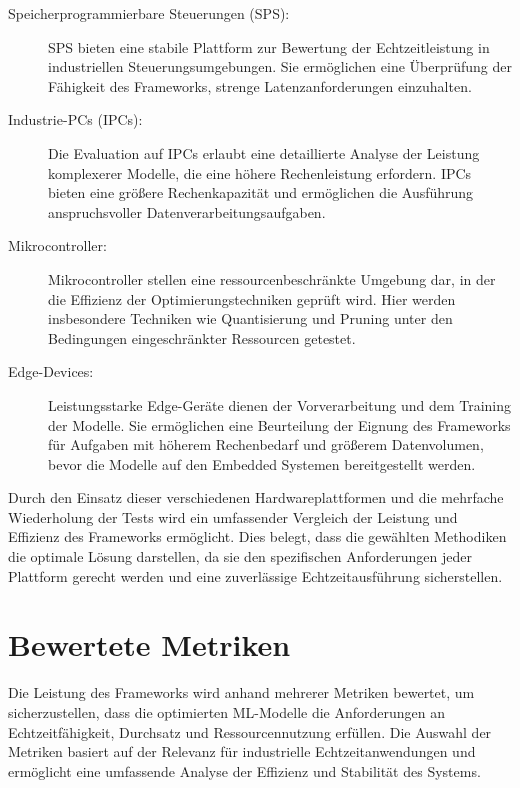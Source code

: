 \begin{description}
    \item[Speicherprogrammierbare Steuerungen (SPS):] SPS bieten eine stabile Plattform zur Bewertung der 
    Echtzeitleistung in industriellen Steuerungsumgebungen. Sie ermöglichen eine Überprüfung der Fähigkeit des Frameworks, strenge Latenzanforderungen einzuhalten.
    
    \item[Industrie-PCs (IPCs):] Die Evaluation auf IPCs erlaubt eine detaillierte Analyse der Leistung komplexerer Modelle, die eine höhere Rechenleistung erfordern. 
    IPCs bieten eine größere Rechenkapazität und ermöglichen die Ausführung anspruchsvoller Datenverarbeitungsaufgaben.
    
    \item[Mikrocontroller:] Mikrocontroller stellen eine ressourcenbeschränkte Umgebung dar, in der die Effizienz der Optimierungstechniken geprüft wird. 
    Hier werden insbesondere Techniken wie Quantisierung und Pruning unter den Bedingungen eingeschränkter Ressourcen getestet.
    
    \item[Edge-Devices:] Leistungsstarke Edge-Geräte dienen der Vorverarbeitung und dem Training der Modelle. Sie ermöglichen eine Beurteilung der Eignung des 
    Frameworks für Aufgaben mit höherem Rechenbedarf und größerem Datenvolumen, bevor die Modelle auf den Embedded Systemen bereitgestellt werden.
\end{description}

Durch den Einsatz dieser verschiedenen Hardwareplattformen und die mehrfache Wiederholung der Tests wird ein umfassender 
Vergleich der Leistung und Effizienz des Frameworks ermöglicht. Dies belegt, dass die gewählten Methodiken die optimale Lösung darstellen, 
da sie den spezifischen Anforderungen jeder Plattform gerecht werden und eine zuverlässige Echtzeitausführung sicherstellen.

\section{Bewertete Metriken}

Die Leistung des Frameworks wird anhand mehrerer Metriken bewertet, um sicherzustellen, dass die optimierten ML-Modelle die 
Anforderungen an Echtzeitfähigkeit, Durchsatz und Ressourcennutzung erfüllen. Die Auswahl der Metriken basiert auf der Relevanz 
für industrielle Echtzeitanwendungen und ermöglicht eine umfassende Analyse der Effizienz und Stabilität des Systems.

